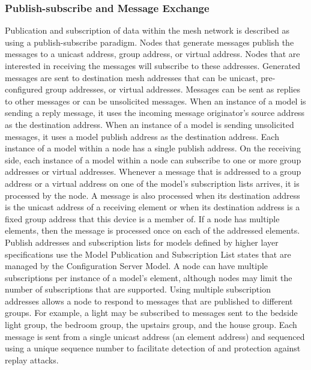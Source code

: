 \documentclass[\main/main.tex]{subfiles}
\begin{document}
\subsubsection{Publish-subscribe and Message Exchange}
Publication and subscription of data within the mesh network is described as using a publish-subscribe paradigm. Nodes that generate messages publish the messages to a unicast address, group address, or virtual address. Nodes that are interested in receiving the messages will subscribe to these addresses.
\newline\newline
Generated messages are sent to destination mesh addresses that can be unicast, pre-configured group addresses, or virtual addresses. Messages can be sent as replies to other messages or can be unsolicited messages. When an instance of a model is sending a reply message, it uses the incoming message originator’s source address as the destination address. When an instance of a model is sending unsolicited messages, it uses a model publish address as the destination address. Each instance of a model within a node has a single publish address.
\newline\newline
On the receiving side, each instance of a model within a node can subscribe to one or more group addresses or virtual addresses. Whenever a message that is addressed to a group address or a virtual address on one of the model’s subscription lists arrives, it is processed by the node. A message is also processed when its destination address is the unicast address of a receiving element or when its destination address is a fixed group address that this device is a member of. If a node has multiple elements, then the message is processed once on each of the addressed elements.
\newline\newline
Publish addresses and subscription lists for models defined by higher layer specifications use the Model Publication and Subscription List states that are managed by the Configuration Server Model.
\newline\newline
A node can have multiple subscriptions per instance of a model’s element, although nodes may limit the number of subscriptions that are supported. Using multiple subscription addresses allows a node to respond to messages that are published to different groups. For example, a light may be subscribed to messages sent to the bedside light group, the bedroom group, the upstairs group, and the house group.
\newline\newline
Each message is sent from a single unicast address (an element address) and sequenced using a unique sequence number to facilitate detection of and protection against replay attacks.
\end{document}
